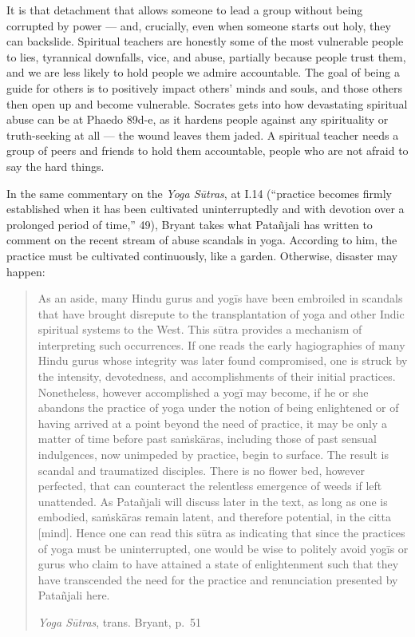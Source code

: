 \documentclass[
]{book}
\begin{document}
It is that detachment that allows someone to lead a group without being corrupted by power --- and, crucially, even when someone starts out holy, they can backslide. Spiritual teachers are honestly some of the most vulnerable people to lies, tyrannical downfalls, vice, and abuse, partially because people trust them, and we are less likely to hold people we admire accountable. The goal of being a guide for others is to positively impact others' minds and souls, and those others then open up and become vulnerable. Socrates gets into how devastating spiritual abuse can be at Phaedo 89d-e, as it hardens people against any spirituality or truth-seeking at all --- the wound leaves them jaded. A spiritual teacher needs a group of peers and friends to hold them accountable, people who are not afraid to say the hard things.

In the same commentary on the \emph{Yoga Sūtras}, at I.14 (``practice becomes firmly established when it has been cultivated uninterruptedly and with devotion over a prolonged period of time,'' 49), Bryant takes what Patañjali has written to comment on the recent stream of abuse scandals in yoga. According to him, the practice must be cultivated continuously, like a garden. Otherwise, disaster may happen:

\begin{quote}
As an aside, many Hindu gurus and yogīs have been embroiled in scandals that have brought disrepute to the transplantation of yoga and other Indic spiritual systems to the West. This sūtra provides a mechanism of interpreting such occurrences. If one reads the early hagiographies of many Hindu gurus whose integrity was later found compromised, one is struck by the intensity, devotedness, and accomplishments of their initial practices. Nonetheless, however accomplished a yogī may become, if he or she abandons the practice of yoga under the notion of being enlightened or of having arrived at a point beyond the need of practice, it may be only a matter of time before past saṁskāras, including those of past sensual indulgences, now unimpeded by practice, begin to surface. The result is scandal and traumatized disciples. There is no flower bed, however perfected, that can counteract the relentless emergence of weeds if left unattended. As Patañjali will discuss later in the text, as long as one is embodied, saṁskāras remain latent, and therefore potential, in the citta {[}mind{]}. Hence one can read this sūtra as indicating that since the practices of yoga must be uninterrupted, one would be wise to politely avoid yogīs or gurus who claim to have attained a state of enlightenment such that they have transcended the need for the practice and renunciation presented by Patañjali here.

\emph{Yoga Sūtras}, trans. Bryant, p.~51
\end{quote}
\end{document}
